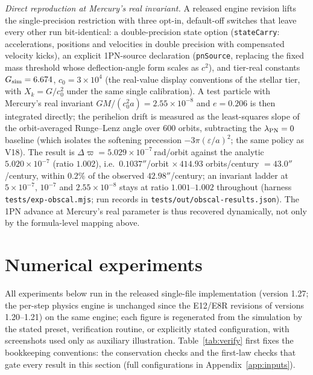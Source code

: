 \documentclass[aps,reprint,amsmath,amssymb,nofootinbib,superscriptaddress,floatfix]{revtex4-2}
\newcommand{\Kt}{X_k}
\begin{document}
\emph{Direct reproduction at Mercury's real invariant.}
A released engine revision lifts the single-precision restriction with
three opt-in, default-off switches that leave every other run
bit-identical: a double-precision state option
(\texttt{stateCarry}: accelerations, positions and velocities in
double precision with compensated velocity kicks), an explicit
1PN-source declaration (\texttt{pnSource}, replacing the fixed mass
threshold whose deflection-angle form scales as $c^2$), and
tier-real constants $G_{\rm sim} = 6.674$, $c_0 = 3\times10^4$ (the
real-value display conventions of the stellar tier, with
$\Kt = G/c_0^2$ under the same single calibration).
A test particle with Mercury's real invariant
$GM/(c_0^2a) = 2.55\times10^{-8}$ and $e = 0.206$ is then integrated
directly; the perihelion drift is measured as the least-squares slope
of the orbit-averaged Runge--Lenz angle over 600 orbits, subtracting
the $\lambda_{\rm PN} = 0$ baseline (which isolates the softening
precession $-3\pi(\varepsilon/a)^2$; the same policy as V18).
The result is $\Delta\varpi = 5.029\times10^{-7}$\,rad/orbit against
the analytic $5.020\times10^{-7}$ (ratio $1.002$), i.e.\
$0.1037''$/orbit $\times\,414.93$ orbits/century $= 43.0''$/century,
within $0.2\%$ of the observed $42.98''$/century; an invariant ladder
at $5\times10^{-7}$, $10^{-7}$ and $2.55\times10^{-8}$ stays at ratio
$1.001$--$1.002$ throughout (harness \texttt{tests/exp-obscal.mjs};
run records in \texttt{tests/out/obscal-results.json}).
The 1PN advance at Mercury's real parameter is thus recovered
dynamically, not only by the formula-level mapping above.

\section{Numerical experiments}
\label{sec:experiments}

All experiments below run in the released single-file implementation
(version 1.27; the per-step physics engine is unchanged since the
E12/E8R revisions of versions 1.20--1.21) on the same engine; each figure is
regenerated from the simulation by the stated preset, verification
routine, or explicitly stated configuration, with
screenshots used only as auxiliary illustration.
Table~\ref{tab:verify} first fixes the bookkeeping conventions: the
conservation checks and the first-law checks that gate every result in
this section (full configurations in Appendix~\ref{app:inputs}).
\end{document}
